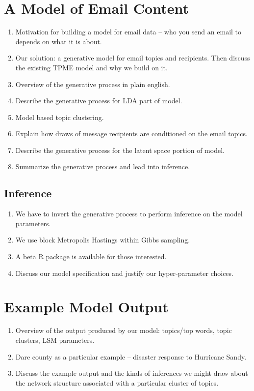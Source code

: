 \documentclass[fleqn]{MJDArticle}
\begin{document}
\section{A Model of Email Content}
\begin{enumerate}
	\item Motivation for building a model for email data -- who you send an email to depends on what it is about. 
	\item Our solution: a generative model for email topics and recipients. Then discuss the existing TPME model and why we build on it. 
	\item Overview of the generative process in plain english.
	\item Describe the generative process for LDA part of model.
	\item Model based topic clustering.
	\item Explain how draws of message recipients are conditioned on the email topics. 
	\item Describe the generative process for the latent space portion of model.
	\item Summarize the generative process and lead into inference. 
\end{enumerate}

\subsection{Inference}
\begin{enumerate}
	\item We have to invert the generative process to perform inference on the model parameters.
	\item We use block Metropolis Hastings within Gibbs sampling.
	\item A beta R package is available for those interested.
	\item Discuss our model specification and justify our hyper-parameter choices.
\end{enumerate}

\section{Example Model Output}
\begin{enumerate}
	\item Overview of the output produced by our model: topics/top words, topic clusters, LSM parameters. 
	\item Dare county as a particular example -- disaster response to Hurricane Sandy. 
	\item Discuss the example output and the kinds of inferences we might draw about the network structure associated with a particular cluster of topics.
\end{enumerate}
\end{document}
